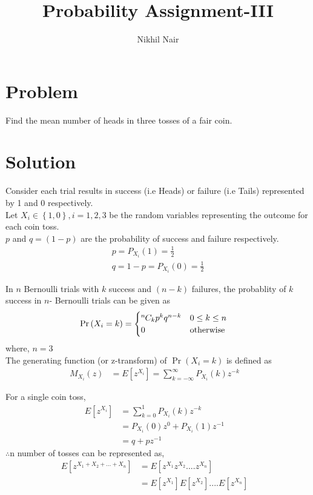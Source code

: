 \documentclass[journal,12pt,twocolumn]{IEEEtran}
\title{\mytitle}
\title{
Probability Assignment-III
}
\author{Nikhil Nair}
\newcommand*{\permcomb}[4][0mu]{{{}^{#3}\mkern#1#2_{#4}}}
\newcommand*{\comb}[1][-1mu]{\permcomb[#1]{C}}
\providecommand{\pr}[1]{\ensuremath{\Pr\left(#1\right)}}
\providecommand{\cbrak}[1]{\ensuremath{\left\{#1\right\}}}
\providecommand{\sbrak}[1]{\ensuremath{{}\left[#1\right]}}
\begin{document}
\maketitle
\bigskip


\section{\textbf{Problem }}
Find the mean number of heads in three tosses of a fair coin.


\section{\textbf{Solution }}
Consider each trial results in success (i.e Heads) or failure (i.e Tails) represented by 1 and 0 respectively.
\\

Let $X_i \in \cbrak{1,0} , i = 1,2,3$ be the random variables representing the outcome for each coin toss. 
\\

$p$ and $q = (1 - p)$ are the probability of success and failure respectively.
\begin{align}
& p = P_{X_i}(1) = \frac{1}{2}&               \label{eq:1}
\\            
& q = 1 - p = P_{X_i}(0) = \frac{1}{2}&       \label{eq:2}
\end{align}

In $n$ Bernoulli trials with $k$ success and $(n - k)$ failures, the probablity of $k$ success in $n$- Bernoulli trials can be given as\\
\begin{align}
\pr{X_i =k}  &= 
\begin{cases}
\comb{n}{k} p^{k}q^{n-k} & 0 \le k \le n
\\
0 & \text{otherwise}                 \label{eq:3}
\end{cases}
\end{align}
where, $n = 3$\\

The generating function (or z-transform) of $\pr{X_i =k}$  is defined as 
\\
\begin{align}
M_{X_i}(z)& = E\sbrak{z^{X_i}} = \sum_{k=-\infty}^{\infty} P_{X_i}(k)z^{-k}&
\end{align}

For a single coin toss,
\begin{align}
E\sbrak{z^{X_i}}& = \sum_{k=0}^{1} P_{X_i}(k) z^{-k}&
\\
&=  P_{X_i}(0) z^{0} + P_{X_i}(1) z^{-1}&
\\
&= q+pz^{-1}&
\end{align}
$\therefore$n number of tosses can be represented as,
\\
\begin{align}
E\sbrak{z^{X_1+X_2+...+X_n}}&= E\sbrak{z^{X_1}z^{X_2}....z^{X_n}}& \nonumber
\\
&= E\sbrak{z^{X_1}}E\sbrak{z^{X_2}}....E\sbrak{z^{X_n}}&
\end{align} 
\end{document}
